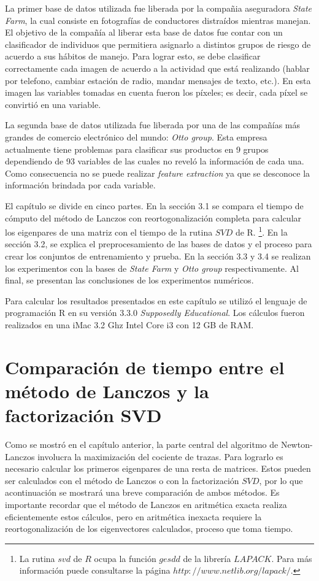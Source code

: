 La primer base de datos utilizada fue liberada por la compañia aseguradora \textit{State Farm}, la cual consiste en fotografías de conductores distraídos mientras manejan. El objetivo de la compañía al liberar esta base de datos fue contar con un clasificador de individuos que permitiera asignarlo a distintos grupos de riesgo de acuerdo a sus hábitos de manejo. Para lograr esto, se debe clasificar correctamente cada imagen de acuerdo a la actividad que está realizando (hablar por telefono, cambiar estación de radio, mandar mensajes de texto, etc.). En esta imagen las variables tomadas en cuenta fueron los píxeles; es decir, cada píxel se convirtió en una variable.

La segunda base de datos utilizada fue liberada por una de las compañías más grandes de comercio electrónico del mundo: \textit{Otto group}. Esta empresa actualmente tiene problemas para clasificar sus productos en 9 grupos dependiendo de 93 variables de las cuales no reveló la información de cada una. Como consecuencia no se puede realizar \textit{feature extraction} ya que se desconoce la información brindada por cada variable. 

El capítulo se divide en cinco partes. En la sección 3.1 se compara el tiempo de cómputo del método de Lanczos con reortogonalización completa para calcular los eigenpares de una matriz con el tiempo de la rutina $SVD$ de R. \footnote{La rutina $svd$ de $R$ ocupa la función $gesdd$ de la librería $LAPACK$. Para más información puede consultarse la página $http://www.netlib.org/lapack/$.}. En la sección 3.2, se explica el preprocesamiento de las bases de datos y el proceso para crear los conjuntos de entrenamiento y prueba. En la sección 3.3 y 3.4 se realizan los experimentos con la bases de \textit{State Farm} y \textit{Otto group} respectivamente. Al final, se presentan las conclusiones de los experimentos numéricos.

Para calcular los resultados presentados en este capítulo se utilizó el lenguaje de programación \textsf{R} en su versión 3.3.0 \textit{Supposedly Educational}. Los cálculos fueron realizados en una iMac 3.2 Ghz Intel Core i3 con 12 GB de RAM.

\section{Comparación de tiempo entre el método de Lanczos y la factorización SVD}

Como se mostró en el capítulo anterior, la parte central del algoritmo de Newton-Lanczos involucra la maximización del cociente de trazas. Para lograrlo es necesario calcular los primeros eigenpares de una resta de matrices. Estos pueden ser calculados con el método de Lanczos o con la factorización $SVD$, por lo que acontinuación se mostrará una breve comparación de ambos métodos. Es importante recordar que el método de Lanczos en aritmética exacta realiza eficientemente estos cálculos, pero en aritmética inexacta requiere la reortogonalización de los eigenvectores calculados, proceso que toma tiempo. 

